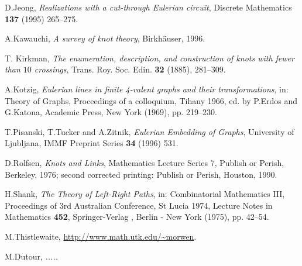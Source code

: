 \documentclass[12pt]{article}
\begin{document}
\begin{thebibliography}{99}
D.Jeong, {\em Realizations with a cut-through Eulerian circuit},
Discrete Mathematics {\bf 137} (1995) 265--275.



A.Kawauchi, {\em A survey of knot theory}, Birkh\"{a}user, 1996.

T. Kirkman, {\em The enumeration, description, and construction of knots with fewer than $10$ crossings}, Trans. Roy. Soc. Edin. {\bf 32} (1885), 281--309.


A.Kotzig, {\em Eulerian lines in finite 4-valent graphs and their 
transformations}, in: Theory of Graphs, Proceedings of a colloquium, 
Tihany 1966, ed. by P.Erdos and G.Katona, Academic Press, 
New York (1969), pp. 219--230.


T.Pisanski, T.Tucker and A.Zitnik, {\em Eulerian Embedding of Graphs},
University of Ljubljana, IMMF Preprint Series {\bf 34}
(1996) 531.

D.Rolfsen, {\em Knots and Links}, Mathematics Lecture Series 7, Publish or
Perish, Berkeley, 1976;
second corrected printing: Publish or Perish, Houston, 1990.

H.Shank, {\em The Theory of Left-Right Paths}, in: Combinatorial 
Mathematics III,
Proceedings of 3rd Australian Conference, St Lucia 1974, Lecture Notes in
Mathematics {\bf 452}, Springer-Verlag , Berlin - New York (1975),  pp. 42--54.

M.Thistlewaite, \url{http://www.math.utk.edu/~morwen}.

M.Dutour, {\em .....}



 
\end{thebibliography}
\end{document}
